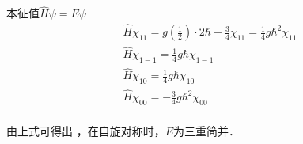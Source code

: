 \begin{enumerate}
本征值$\hat{H}\psi = E\psi $ \\
\begin{equation}
\begin{aligned}
& \hat{H}\chi_{11} = g(\frac{1}{2}) \cdot 2\hbar - \frac{3}{4} \chi_{11} = \frac{1}{4}g\hbar^{2} \chi_{11}  \\
& \hat{H}\chi_{1-1} = \frac{1}{4}g\hbar \chi_{1-1}  \\
& \hat{H}\chi_{10} = \frac{1}{4}g\hbar \chi_{10}  \\
& \hat{H}\chi_{00} = -\frac{3}{4}g\hbar^{2} \chi_{00}  \\
\end{aligned}
\end{equation}

由上式可得出 ，在自旋对称时，$E$为三重简并．
\end{enumerate}